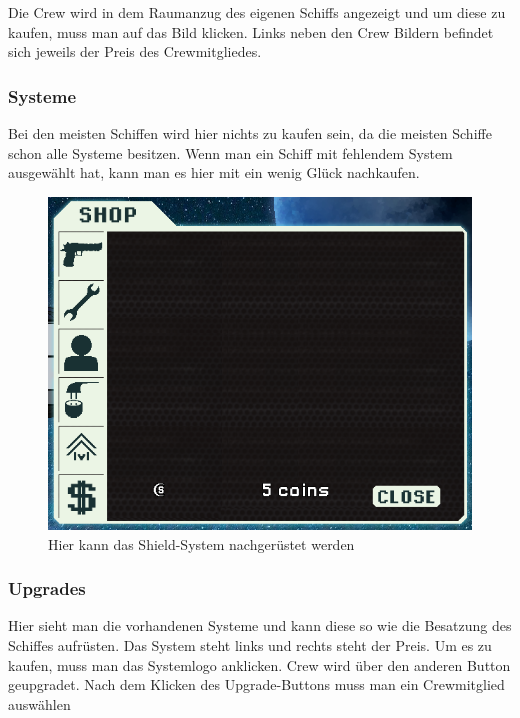 \documentclass[fontsize=12pt,paper=a4,twoside]{scrartcl}
\begin{document}
Die Crew wird in dem Raumanzug des eigenen Schiffs angezeigt und um diese zu kaufen, muss man auf das Bild klicken. Links neben den Crew Bildern befindet sich jeweils der Preis des Crewmitgliedes. 

\subsubsection{Systeme}

Bei den meisten Schiffen wird hier nichts zu kaufen sein, da die meisten Schiffe schon alle Systeme besitzen. Wenn man ein Schiff mit fehlendem System ausgewählt hat, kann man es hier mit ein wenig Glück nachkaufen. 

\begin{figure}[H]
\centering
\includegraphics[width=1\linewidth]{DasSpiel/Shop/sys.png}
\caption{Hier kann das Shield-System nachgerüstet werden}
\end{figure}

\subsubsection{Upgrades}

Hier sieht man die vorhandenen Systeme und kann diese so wie die Besatzung des Schiffes aufrüsten. Das System steht links und rechts steht der Preis. Um es zu kaufen, muss man das Systemlogo anklicken. Crew wird über den anderen Button geupgradet. Nach dem Klicken des Upgrade-Buttons muss man ein Crewmitglied auswählen 
\end{document}
